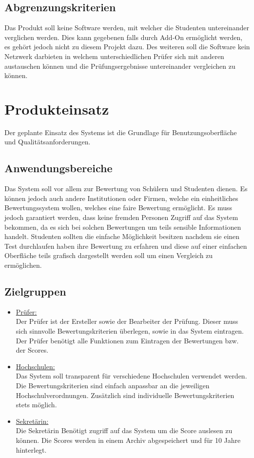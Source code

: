 \documentclass[a4paper,listof=leveldown,listof=numbered]{scrreprt}
\begin{document}
	\section{Abgrenzungskriterien}
	Das Produkt soll keine Software werden, mit welcher die Studenten untereinander verglichen werden. Dies kann gegebenen falls durch \acs{Add-On} ermöglicht werden, es gehört jedoch nicht zu diesem Projekt dazu. Des weiteren soll die Software kein Netzwerk darbieten in welchem unterschiedlichen Prüfer sich mit anderen austauschen können und die Prüfungsergebnisse untereinander vergleichen zu können.
	
\chapter{Produkteinsatz}
	Der geplante Einsatz des Systems ist die Grundlage für Benutzungsoberfläche und
	Qualitätsanforderungen.
	
	\section{Anwendungsbereiche}
	Das System soll vor allem zur Bewertung von Schülern und Studenten dienen. Es können jedoch auch andere Institutionen oder Firmen, welche ein einheitliches Bewertungssystem wollen, welches eine faire Bewertung ermöglicht. Es muss jedoch garantiert werden, dass keine fremden Personen Zugriff auf das System bekommen, da es sich bei solchen Bewertungen um teils sensible Informationen handelt. Studenten sollten die einfache Möglichkeit besitzen nachdem sie einen Test durchlaufen haben ihre Bewertung zu erfahren und diese auf einer einfachen Oberfläche teils grafisch dargestellt werden soll um einen Vergleich zu ermöglichen.
	
	\section{Zielgruppen}
	\begin{itemize}
		\item \underline{Prüfer:}\\
	Der Prüfer ist der Ersteller sowie der Bearbeiter der Prüfung. Dieser muss sich sinnvolle Bewertungskriterien überlegen, sowie in das System eintragen. Der Prüfer benötigt alle Funktionen zum Eintragen der Bewertungen bzw. der Scores.
	
		\item \underline{Hochschulen:}\\
	Das System soll transparent für verschiedene Hochschulen verwendet werden.  Die Bewertungskriterien sind einfach anpassbar an die jeweiligen Hochschulverordnungen. Zusätzlich sind individuelle Bewertungskriterien stets möglich.
			
		\item \underline{Sekretärin:}\\
	Die Sekretärin Benötigt zugriff auf das System um die Score auslesen zu können. Die Scores werden in einem Archiv abgespeichert und für 10 Jahre hinterlegt. 	
		
	\end{itemize}
\end{document}
